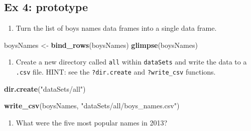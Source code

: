 \documentclass[
]{book}
\newenvironment{Shaded}{\begin{snugshade}}{\end{snugshade}}
\newcommand{\DecValTok}[1]{\textcolor[rgb]{0.00,0.00,0.81}{#1}}
\newcommand{\KeywordTok}[1]{\textcolor[rgb]{0.13,0.29,0.53}{\textbf{#1}}}
\newcommand{\NormalTok}[1]{#1}
\newcommand{\OperatorTok}[1]{\textcolor[rgb]{0.81,0.36,0.00}{\textbf{#1}}}
\newcommand{\StringTok}[1]{\textcolor[rgb]{0.31,0.60,0.02}{#1}}
\providecommand{\tightlist}{%
  \setlength{\itemsep}{0pt}\setlength{\parskip}{0pt}}
\begin{document}
\hypertarget{ex-4-prototype-1}{%
\subsection{Ex 4: prototype}\label{ex-4-prototype-1}}

\begin{enumerate}
\def\labelenumi{\arabic{enumi}.}
\tightlist
\item
  Turn the list of boys names data frames into a single data frame.
\end{enumerate}

\begin{Shaded}
\begin{Highlighting}[]
\NormalTok{boysNames <-}\StringTok{ }\KeywordTok{bind_rows}\NormalTok{(boysNames)}
\KeywordTok{glimpse}\NormalTok{(boysNames)}
\end{Highlighting}
\end{Shaded}

\begin{enumerate}
\def\labelenumi{\arabic{enumi}.}
\setcounter{enumi}{1}
\tightlist
\item
  Create a new directory called \texttt{all} within \texttt{dataSets} and write the data to a \texttt{.csv} file. HINT: see the \texttt{?dir.create} and \texttt{?write\_csv} functions.
\end{enumerate}

\begin{Shaded}
\begin{Highlighting}[]
\KeywordTok{dir.create}\NormalTok{(}\StringTok{"dataSets/all"}\NormalTok{)}

\KeywordTok{write_csv}\NormalTok{(boysNames, }\StringTok{"dataSets/all/boys_names.csv"}\NormalTok{)}
\end{Highlighting}
\end{Shaded}

\begin{enumerate}
\def\labelenumi{\arabic{enumi}.}
\setcounter{enumi}{2}
\tightlist
\item
  What were the five most popular names in 2013?
\end{enumerate}

\begin{Shaded}
\end{Shaded}
\end{document}
